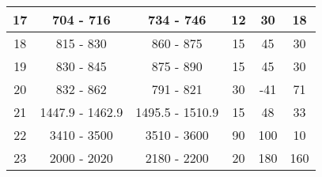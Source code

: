 \begin{table}[]
\begin{tabular}{|c|c|c|c|c|c|}
17                                                          & 704 - 716                                              & 734 - 746                                                & 12                                                                   & 30                                                               & 18                                                          \\ \hline
18                                                          & 815 - 830                                              & 860 - 875                                                & 15                                                                   & 45                                                               & 30                                                          \\ \hline
19                                                          & 830 - 845                                              & 875 - 890                                                & 15                                                                   & 45                                                               & 30                                                          \\ \hline
20                                                          & 832 - 862                                              & 791 - 821                                                & 30                                                                   & -41                                                              & 71                                                          \\ \hline
21                                                          & 1447.9 - 1462.9                                        & 1495.5 - 1510.9                                          & 15                                                                   & 48                                                               & 33                                                          \\ \hline
22                                                          & 3410 - 3500                                            & 3510 - 3600                                              & 90                                                                   & 100                                                              & 10                                                          \\ \hline
23                                                          & 2000 - 2020                                            & 2180 - 2200                                              & 20                                                                   & 180                                                              & 160                                                         \\ \hline

\end{tabular}
\end{table}
